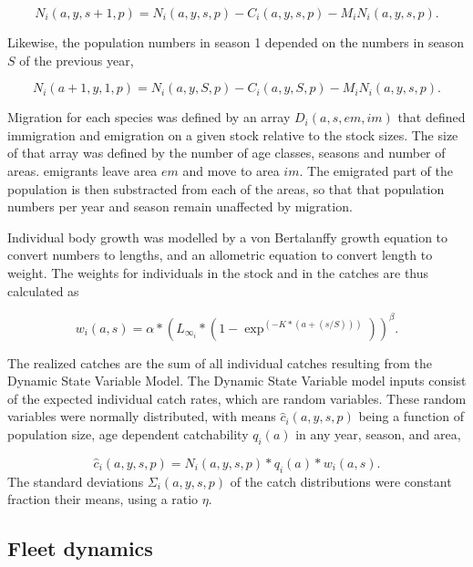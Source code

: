 \documentclass[12pt,oneline,a4paper,numbib]{ouparticle}
\numberwithin{equation}{subsection} %
\begin{document}
\begin{equation}
N_i (a, y, s+1, p) = N_i (a, y, s, p) - C_i (a, y, s, p) - M_i N_i (a, y, s, p) . 
\end{equation}

Likewise, the population numbers in season 1 depended on the numbers in season $S$ of the previous year,

\begin{equation}
N_i (a+1, y, 1, p) = N_i (a, y, S, p) - C_i (a, y, S, p) - M_i N_i (a, y, s, p). 
\end{equation}

Migration for each species was defined by an array $D_i (a, s, em, im)$ that defined  immigration and emigration on a given stock relative to the stock sizes. The size of that array was defined by the number of age classes, seasons and number of areas. emigrants leave area $em$ and move to area $im$. The emigrated part of the population is then substracted from each of the areas, so that that population numbers per year and season remain unaffected by migration.   

Individual body growth was modelled by a von Bertalanffy growth equation to convert numbers to lengths, and an allometric equation to convert length to weight. The weights for individuals in the stock and in the catches are thus calculated as

\begin{equation}
w_i(a,s) =  \alpha * ( L_{\infty_i} * (1-\exp^{(-K * (a+(s/S)))}))^{\beta}.
\end{equation}

The realized catches are the sum of all individual catches resulting from the Dynamic State Variable Model. The Dynamic State Variable model inputs consist of the expected individual catch rates, which are random variables. These random variables were normally distributed, with means $\hat c_i (a, y, s, p)$ being a function of population size, age dependent catchability $q_i (a)$ in any year, season, and area,  

\begin{equation}
\hat c_i (a, y, s, p) = N_i (a, y, s, p) * q_i (a)  * w_i(a,s).
\end{equation}
The standard deviations $\Sigma_i (a, y, s, p)$ of the catch distributions were constant fraction  their means, using a ratio $\eta$. 

\subsection{Fleet dynamics}
\end{document}
